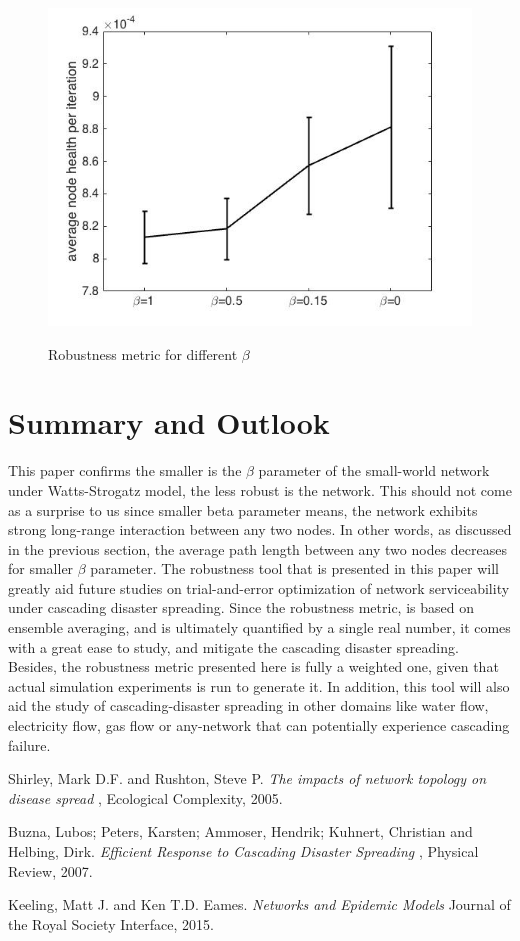 \documentclass[11pt]{article}
\begin{document}
\begin{figure}[t!]
\centering
\includegraphics[width=0.70\columnwidth]{images/periteration.jpg}
\label{errorBar}
\caption{Robustness metric for different $\beta$}
\end{figure}
\clearpage

\section{Summary and Outlook}
This paper confirms the smaller is the $\beta$ parameter of the small-world network under Watts-Strogatz model, the less robust is the network. This should not come as a surprise to us since smaller beta parameter means, the network exhibits strong long-range interaction between any two nodes. In other words, as discussed in the previous section, the average path length between any two nodes decreases for smaller $\beta$ parameter. The robustness tool that is presented in this paper will greatly aid future studies on trial-and-error optimization of network serviceability under cascading disaster spreading. Since the robustness metric, is based on ensemble averaging, and is ultimately quantified by a single real number, it comes with a great ease to study, and mitigate the cascading disaster spreading. Besides, the robustness metric presented here is fully a weighted one, given that actual simulation experiments is run to generate it. In addition, this tool will also aid the study of cascading-disaster spreading in other domains like water flow, electricity flow, gas flow or any-network that can potentially experience cascading failure.

\newpage
\begin{thebibliography}{9}
 Shirley, Mark D.F. and Rushton, Steve P. \textit{ The impacts of network topology on disease spread }, Ecological Complexity, 2005.

 Buzna, Lubos; Peters, Karsten; Ammoser, Hendrik;  Kuhnert, Christian and Helbing, Dirk.\textit{ Efficient Response to Cascading Disaster Spreading }, Physical Review, 2007.

Keeling, Matt J. and Ken T.D. Eames. \textit{ Networks and Epidemic Models } Journal of the Royal Society Interface, 2015.

\end{thebibliography}
\end{document}
